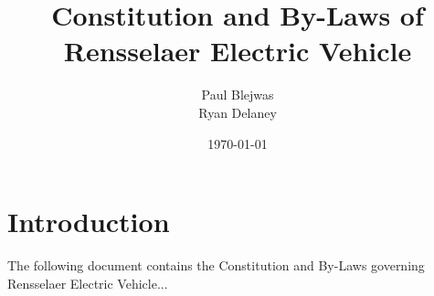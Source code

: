 \documentclass[date, maintoc, notoc]{combine}
\title{Constitution and By-Laws of Rensselaer Electric Vehicle}
\author{Paul Blejwas \\ Ryan Delaney}
\date{\today}
\begin{document}
\pagestyle{combine}
\maketitle
\newpage
\tableofcontents
\clearpage

\section{Introduction}
\label{intro}

The following document contains the Constitution and By-Laws governing Rensselaer Electric Vehicle...

\begin{papers}


\end{papers}
\clearpage
\end{document}
